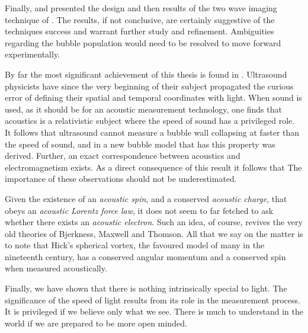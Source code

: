 Finally,  and  presented the 
design  and then results of the two wave imaging technique of .
The results, if not conclusive, are certainly suggestive of the techniques success
and warrant further study and refinement.
Ambiguities regarding the bubble population would need to be resolved to move forward experimentally.


By far the most significant achievement of this thesis is found in .
Ultrasound physicists have since the very beginning of their subject propagated the curious
error of defining their spatial and temporal coordinates with light.
When sound is used, 
as it should be for an acoustic measurement technology,
one finds that acoustics is a relativistic subject where the speed of sound has a privileged role.
It follows that ultrasound cannot measure a bubble wall collapsing at faster than the speed of sound,
and in  a new bubble model that has this property was derived.
Further, an exact correspondence between acoustics and electromagnetism exists.
As a direct consequence of this result it follows that 
The importance of these observations should not be underestimated.

Given the existence of an {\em acoustic spin},  and a conserved {\em acoustic charge},
that obeys an {\em acoustic Lorentz force law},
it does not seem to far fetched to ask whether there exists an {\em acoustic electron}.
Such an idea, of course, 
revives the very old theories of Bjerkness\cite{Bjerknes1905}, Maxwell\cite{Maxwell1861} and Thomson\cite{Thomson1931}.
All that we say on the matter is to note that 
Hick's spherical vortex, the favoured model of many in the nineteenth century,
has a conserved angular momentum\cite{Pekeris1976,Pekeris1977} and a conserved spin\cite{Moffatt1969,Moffatt1988}
when measured acoustically.

Finally, 
we have shown that there is nothing intrinsically special to light.
The significance of the speed of light results from its  role in the measurement process.
It is privileged if we believe only what we see.
There is much to understand in the world if we are prepared to be more open minded.


